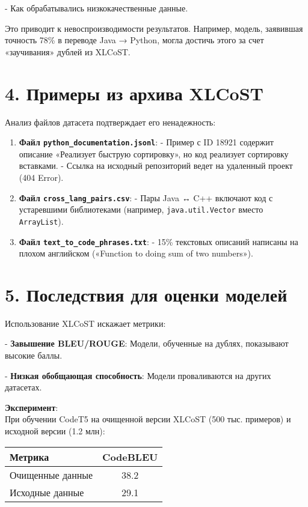 \documentclass[14pt]{article}
\theoremstyle{definition}
\begin{document}
- Как обрабатывались низкокачественные данные.


Это приводит к невоспроизводимости результатов. Например, модель, заявившая точность 78\% в переводе Java → Python, могла достичь этого за счет «заучивания» дублей из XLCoST.

\section*{4. Примеры из архива XLCoST}

Анализ файлов датасета подтверждает его ненадежность:
\begin{enumerate}
    \item \textbf{Файл \texttt{python\_documentation.jsonl}}:  
      - Пример с ID 18921 содержит описание «Реализует быструю сортировку», но код реализует сортировку вставками.  
      - Ссылка на исходный репозиторий ведет на удаленный проект (404 Error).
    \item \textbf{Файл \texttt{cross\_lang\_pairs.csv}}:  
      - Пары Java ↔ C++ включают код с устаревшими библиотеками (например, \texttt{java.util.Vector} вместо \texttt{ArrayList}).
    \item \textbf{Файл \texttt{text\_to\_code\_phrases.txt}}:  
      - 15\% текстовых описаний написаны на плохом английском («Function to doing sum of two numbers»).
\end{enumerate}

\section*{5. Последствия для оценки моделей}

Использование XLCoST искажает метрики:

    
- \textbf{Завышение BLEU/ROUGE}: Модели, обученные на дублях, показывают высокие баллы.
    
- \textbf{Низкая обобщающая способность}: Модели проваливаются на других датасетах.


\textbf{Эксперимент}: \\
При обучении CodeT5 на очищенной версии XLCoST (500 тыс. примеров) и исходной версии (1.2 млн):
\begin{center}
\begin{tabular}{|l|c|}
\hline
\textbf{Метрика} & \textbf{CodeBLEU} \\ \hline
Очищенные данные & 38.2 \\ \hline
Исходные данные & 29.1 \\ \hline
\end{tabular}
\end{center}
\end{document}

